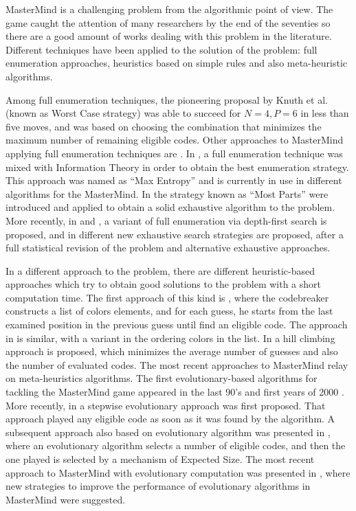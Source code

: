 MasterMind is a challenging problem from the algorithmic point of
view. The game caught the attention of many researchers by the end of
the seventies so there are a good amount of works dealing with this
problem in the literature. Different techniques have been applied to
the solution of the problem: full enumeration approaches, heuristics
based on simple rules and also meta-heuristic algorithms.

Among full enumeration techniques, the pioneering proposal by Knuth et
al. \cite{Knuth77} (known as Worst Case strategy) was able to
succeed for $N=4,P=6$ in less than five moves, and was based on choosing the
combination that minimizes the maximum number of remaining eligible
codes. Other approaches to MasterMind applying full enumeration
techniques are \cite{Irving79,Koyoma93}. In \cite{Bestavros86}, a full
enumeration technique was mixed with Information Theory in order to
obtain the best enumeration strategy. This approach was named as ``Max
Entropy'' and is currently in use in different algorithms for the
MasterMind. In \cite{Kooi05} the strategy known as ``Most Parts'' were
introduced and applied to obtain a solid exhaustive algorithm to the
problem. More recently, in \cite{Chen07} and \cite{Chen07b}, a variant
of full enumeration via depth-first search is proposed, and in
\cite{Merelo12} different new exhaustive search strategies are
proposed, after a full statistical revision of the problem and
alternative exhaustive approaches.

In a different approach to the problem, there are different heuristic-based approaches which try to
obtain good solutions to the problem with a short computation
time. The first approach of this kind is \cite{Shapiro83}, where the
codebreaker constructs a list of colors elements, and for each guess,
he starts from the last examined position in the previous guess until
find an eligible code. The approach in \cite{Swaszek00} is similar,
with a variant in the ordering colors in the list. In \cite{Kovacs03}
a hill climbing approach is proposed, which minimizes the average
number of guesses and also the number of evaluated codes. The most
recent approaches to MasterMind relay on meta-heuristics
algorithms. The first evolutionary-based algorithms for tackling the
MasterMind game appeared in the last 90's and first years of 2000
\cite{Bernier96,Bento99,Kalister03}. More recently, in \cite{Merelo06}
a stepwise evolutionary approach was first proposed. That approach
played any eligible code as soon as it was found by the algorithm. A
subsequent approach also based on evolutionary algorithm was presented
in \cite{Berghman09}, where an evolutionary algorithm selects a number
of eligible codes, and then the one played is selected by a mechanism
of Expected Size. The most recent approach to MasterMind with
evolutionary computation was presented in \cite{Merelo12h}, where
new strategies to improve the performance of evolutionary algorithms
in MasterMind were suggested.

